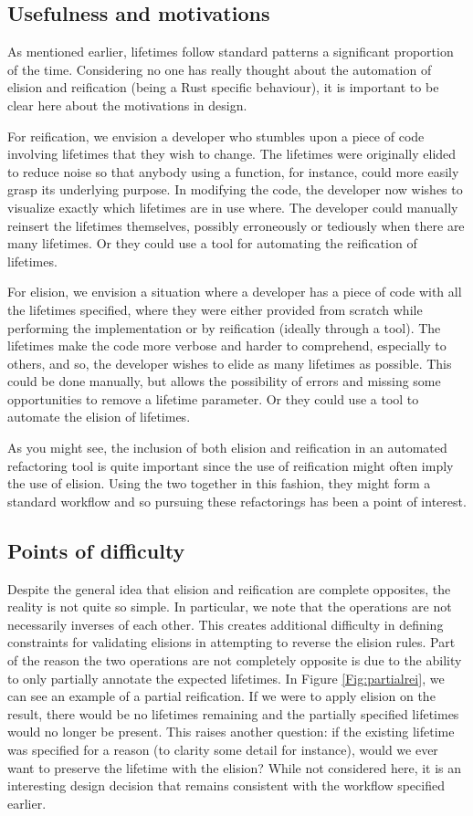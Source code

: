 \subsection{Usefulness and motivations}
As mentioned earlier, lifetimes follow standard patterns a significant proportion of the time. Considering no one has really thought about the automation of elision and reification (being a Rust specific behaviour), it is important to be clear here about the motivations in design. 

For reification, we envision a developer who stumbles upon a piece of code involving lifetimes that they wish to change. The lifetimes were originally elided to reduce noise so that anybody using a function, for instance, could more easily grasp its underlying purpose. In modifying the code, the developer now wishes to visualize exactly which lifetimes are in use where. The developer could manually reinsert the lifetimes themselves, possibly erroneously or tediously when there are many lifetimes. Or they could use a tool for automating the reification of lifetimes.

For elision, we envision a situation where a developer has a piece of code with all the lifetimes specified, where they were either provided from scratch while performing the implementation or by reification (ideally through a tool). The lifetimes make the code more verbose and harder to comprehend, especially to others, and so, the developer wishes to elide as many lifetimes as possible. This could be done manually, but allows the possibility of errors and missing some opportunities to remove a lifetime parameter. Or they could use a tool to automate the elision of lifetimes. 

As you might see, the inclusion of both elision and reification in an automated refactoring tool is quite important since the use of reification might often imply the use of elision. Using the two together in this fashion, they might form a standard workflow and so pursuing these refactorings has been a point of interest.

\subsection{Points of difficulty}\label{S:pod}
Despite the general idea that elision and reification are complete opposites, the reality is not quite so simple. In particular, we note that the operations are not necessarily inverses of each other. This creates additional difficulty in defining constraints for validating elisions in attempting to reverse the elision rules. Part of the reason the two operations are not completely opposite is due to the ability to only partially annotate the expected lifetimes. In Figure \ref{Fig:partialrei}, we can see an example of a partial reification. If we were to apply elision on the result, there would be no lifetimes remaining and the partially specified lifetimes would no longer be present. This raises another question: if the existing lifetime was specified for a reason (to clarity some detail for instance), would we ever want to preserve the lifetime with the elision? While not considered here, it is an interesting design decision that remains consistent with the workflow specified earlier. 

